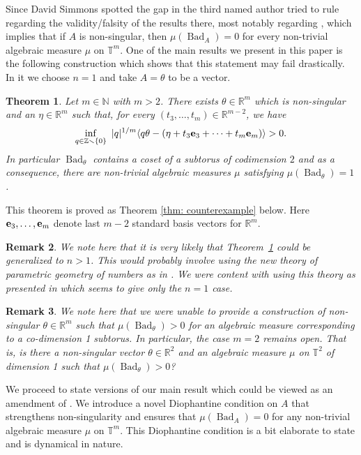 \documentclass[reqno,11pt, twoside]{amsart}
\theoremstyle{plain}
\newtheorem{thm}{Theorem}[section]
\newtheorem{rem}[thm]{Remark}
\theoremstyle{definition}
\theoremstyle{definition}
\theoremstyle{remark}
\numberwithin{equation}{section}
\newcommand{\R}{{\mathbb{R}}}
\newcommand{\Z}{{\mathbb{Z}}}
\newcommand{\N}{{\mathbb{N}}}
\newcommand{\ve}{{\bf e}}
\newcommand{\bR}{\mathbb{R}}
\newcommand{\bT}{\mathbb{T}}
\newcommand\idist[1]{\langle#1\rangle}
\newcommand\on[1]{\operatorname{#1}}
\begin{document}
Since David Simmons spotted the gap in \cite[\S2.2,\S3.2]{GDV} the third named author tried to rule regarding the validity/falsity of the results there, most notably regarding \cite[Theorem 2.3]{GDV}, which implies that if 
$A$ is non-singular, then $\mu(\on{Bad}_A)=0$ for every non-trivial 
algebraic 
measure $\mu$ on $\bT^m$. One of the main results we present in this paper is the following construction which shows that this statement may fail drastically. In it we choose $n=1$ and take $A=\theta$ to be a vector.
\begin{thm}\label{thm: counterexample intro}
    Let $m \in \N$ with $m > 2$. There exists $\theta \in \bR^m$ which is non-singular and an $\eta \in \bR^m$ such that, for every $(t_3,
    \dots, t_m) \in \R^{m-2}$, we have
    \begin{equation*}
        \inf_{q \in \Z \smallsetminus \{0\}} \ |q|^{1/m} \idist{q\theta  -( \eta + t_3\ve_3 + \dots + t_m \ve_m)} > 0.
    \end{equation*}
    In particular $\on{Bad}_\theta$ contains a coset of a subtorus of codimension $2$ and as a consequence, there are non-trivial algebraic measures $\mu$ satisfying $\mu(\on{Bad}_\theta) =1$.
\end{thm}
This theorem is proved as Theorem \ref{thm: counterexample} below.
    Here $\ve_3,\dots, \ve_m$ denote last $m-2$ standard basis vectors for $\R^m$.
\begin{rem}
    We note here that it is very likely that Theorem~\ref{thm: counterexample intro} could be generalized to $n>1$. This would probably involve using the new 
    theory of parametric geometry of numbers as in \cite{DFSU}. We were content with using this theory as presented in \cite{Roy-MathZ} which seems to give only the $n=1$ case.
\end{rem}
\begin{rem}
    We note here that we were unable to provide a construction of non-singular
    $\theta\in \bR^m$ such that $\mu(\on{Bad}_\theta)>0$ for an algebraic measure corresponding to a co-dimension 1 subtorus. In particular, the case $m=2$ remains open. That is, is there a non-singular vector $\theta\in \bR^2$ and an algebraic measure $\mu$ on $\bT^2$ of dimension 1 such that $\mu(\on{Bad}_\theta)>0$?
\end{rem}
We proceed to state versions of our main result which could be viewed as an amendment of \cite[Theorem 2.3]{GDV}. We introduce a novel Diophantine condition on $A$ that strengthens non-singularity and ensures that $\mu(\on{Bad}_A)=0$ for any non-trivial algebraic measure $\mu$ on $\bT^m$. 
This Diophantine condition is a bit elaborate to state and is dynamical in nature. 
\end{document}
